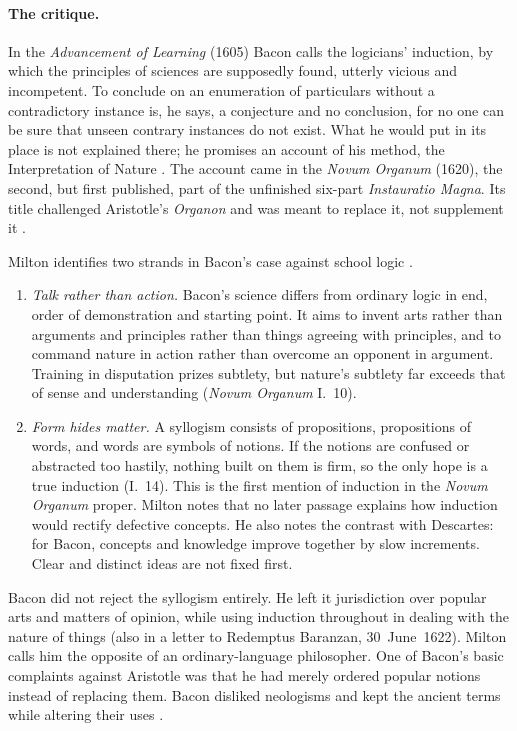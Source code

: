 \paragraph{The critique.}
In the \emph{Advancement of Learning} (1605) Bacon calls the logicians'
induction, by which the principles of sciences are supposedly found,
utterly vicious and incompetent. To conclude on an enumeration of
particulars without a contradictory instance is, he says, a conjecture and
no conclusion, for no one can be sure that unseen contrary instances do not
exist. What he would put in its place is not explained there; he promises
an account of his method, the Interpretation of Nature
\cite[pp.~23--24]{Milton2011InductionBeforeHume}. The account came in the
\emph{Novum Organum} (1620), the second, but first published, part of the
unfinished six-part \emph{Instauratio Magna}. Its title challenged
Aristotle's \emph{Organon} and was meant to replace it, not supplement it
\cite[p.~24]{Milton2011InductionBeforeHume}.

Milton identifies two strands in Bacon's case against school logic
\cite[pp.~24--25]{Milton2011InductionBeforeHume}.
\begin{enumerate}
\item \emph{Talk rather than action.} Bacon's science differs from
  ordinary logic in end, order of demonstration and starting point. It aims
  to invent arts rather than arguments and principles rather than things
  agreeing with principles, and to command nature in action rather than
  overcome an opponent in argument. Training in disputation prizes
  subtlety, but nature's subtlety far exceeds that of sense and
  understanding (\emph{Novum Organum} I.~10).
\item \emph{Form hides matter.} A syllogism consists of propositions,
  propositions of words, and words are symbols of notions. If the notions
  are confused or abstracted too hastily, nothing built on them is firm, so
  the only hope is a true induction (I.~14). This is the first mention of
  induction in the \emph{Novum Organum} proper. Milton notes that no later
  passage explains how induction would rectify defective concepts. He also
  notes the contrast with Descartes: for Bacon, concepts and knowledge
  improve together by slow increments. Clear and distinct ideas are not
  fixed first.
\end{enumerate}
Bacon did not reject the syllogism entirely. He left it jurisdiction over
popular arts and matters of opinion, while using induction throughout in
dealing with the nature of things (also in a letter to Redemptus Baranzan,
30~June~1622). Milton calls him the opposite of an ordinary-language
philosopher. One of Bacon's basic complaints against Aristotle was that
he had merely ordered popular notions instead of replacing them. Bacon
disliked neologisms and kept the ancient terms while altering their uses
\cite[p.~25, n.~15]{Milton2011InductionBeforeHume}.


